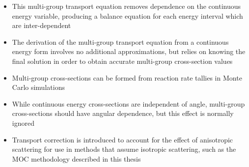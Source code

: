 
\newpage
\vfill
\begin{highlightsbox}[frametitle=Highlights]
	\begin{itemize}
		\item This multi-group transport equation removes dependence on the continuous energy variable, producing a balance equation for each energy interval which are inter-dependent
		\item The derivation of the multi-group transport equation from a continuous energy form involves no additional approximations, but relies on knowing the final solution in order to obtain accurate multi-group cross-section values
		\item Multi-group cross-sections can be formed from reaction rate tallies in Monte Carlo simulations
		\item While continuous energy cross-sections are independent of angle, multi-group cross-sections should have angular dependence, but this effect is normally ignored
		\item Transport correction is introduced to account for the effect of anisotropic scattering for use in methods that assume isotropic scattering, such as the \ac{MOC} methodology described in this thesis
	\end{itemize}
\end{highlightsbox}
\vfill
